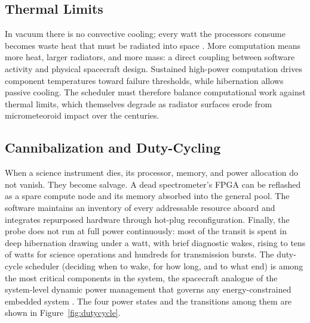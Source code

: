 \documentclass[10pt, a4paper]{article}
\begin{document}
\subsection{Thermal Limits}

In vacuum there is no convective cooling; every watt the processors consume becomes waste heat that must be radiated into space \cite{gilmore2002}. More computation means more heat, larger radiators, and more mass: a direct coupling between software activity and physical spacecraft design. Sustained high-power computation drives component temperatures toward failure thresholds, while hibernation allows passive cooling. The scheduler must therefore balance computational work against thermal limits, which themselves degrade as radiator surfaces erode from micrometeoroid impact over the centuries.

\subsection{Cannibalization and Duty-Cycling}

When a science instrument dies, its processor, memory, and power allocation do not vanish. They become salvage. A dead spectrometer's FPGA can be reflashed as a spare compute node and its memory absorbed into the general pool. The software maintains an inventory of every addressable resource aboard and integrates repurposed hardware through hot-plug reconfiguration. Finally, the probe does not run at full power continuously: most of the transit is spent in deep hibernation drawing under a watt, with brief diagnostic wakes, rising to tens of watts for science operations and hundreds for transmission bursts. The duty-cycle scheduler (deciding when to wake, for how long, and to what end) is among the most critical components in the system, the spacecraft analogue of the system-level dynamic power management that governs any energy-constrained embedded system \cite{benini2000}. The four power states and the transitions among them are shown in Figure~\ref{fig:dutycycle}.
\end{document}
